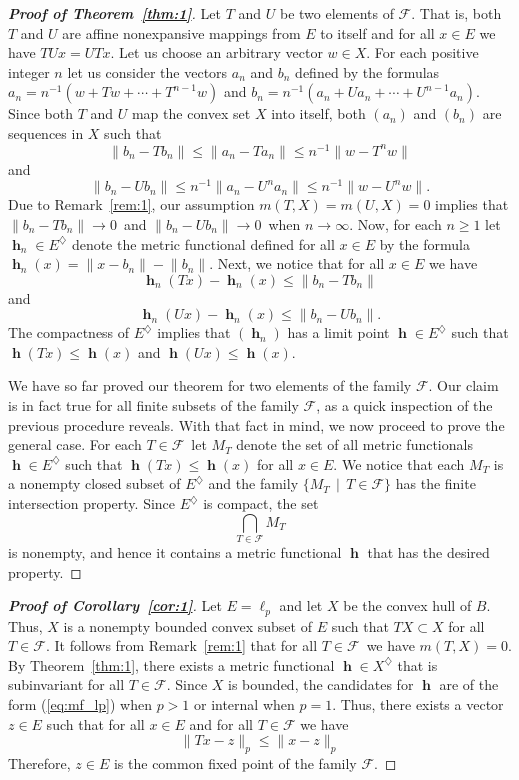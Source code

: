 \documentclass[a4paper,12pt]{article}
\theoremstyle{definition}
\numberwithin{equation}{section}
\newcommand{\norm}[1]{\lVert#1\rVert} %
\newcommand{\F}{\mathcal{F}} %
\numberwithin{equation}{section}
\DeclareMathOperator{\h}{\mathbf{h}} %
\begin{document}
\begin{proof}
[\bf{Proof of Theorem~{\upshape\ref{thm:1}}}]
Let $T$ and $U$ be two elements of $\F$. That 
is, both $T$ and $U$ are affine nonexpansive
mappings from $E$ to itself and for all 
$x \in E$ we have $TUx=UTx$. Let us choose an
arbitrary vector $w\in X$. For each positive
integer $n$ let us consider the vectors $a_n$ 
and $b_n$ defined by the formulas 
$a_n = n^{-1}(w + Tw + \cdots + T^{n-1}w)$
and
$b_n = n^{-1}(a_n + Ua_n + \cdots + U^{n-1}a_n)$.
Since both $T$ and $U$ map the convex set $X$
into itself, both $(a_n)$ and $(b_n)$ are 
sequences in $X$ such that
$$
\norm{b_n - T b_n} 
    \leq \norm{a_n - T a_n} 
    \leq n^{-1}\norm{w - T^n w} 
$$
and 
$$
\norm{b_n - U b_n} 
    \leq n^{-1}\norm{a_n - U^n a_n} 
    \leq n^{-1}\norm{w - U^n w}.
$$
Due to Remark~\ref{rem:1}, our assumption 
$m(T,X)=m(U,X)=0$ implies that  
$\norm{b_n - T b_n} \to 0\,$ and 
$\norm{b_n - U b_n} \to 0\,$ 
when $n\to\infty$. Now, for each $n\geq 1$ 
let $\h_n \in E^\diamondsuit$ denote the 
metric functional defined for all $x\in E$
by the formula 
$\h_n(x) = \norm{x-b_{n}}-\norm{b_{n}}$.
Next, we notice that for all $x\in E$ we have
$$
\h_n(Tx) - \h_n(x) \leq \norm{b_n - T b_n}
$$
and 
$$
\h_n(Ux) - \h_n(x) \leq \norm{b_n - U b_n}.
$$
The compactness of $E^\diamondsuit$ implies 
that $(\h_n)$ has a limit point 
$\h\in E^\diamondsuit$ such that 
$\h(Tx)\leq \h(x)$ and $\h(Ux)\leq\h(x)$.

We have so far proved our theorem for two 
elements of the family $\F$. Our claim is in 
fact true for all finite subsets of the 
family $\F$, as a quick inspection of the 
previous procedure reveals. With that fact in 
mind, we now proceed to prove the general 
case. For each $T \in \F\,$ let $M_T$ denote 
the set of all metric functionals 
$\h \in E^\diamondsuit$ such that 
$\h(Tx)\leq \h(x)$ for all $x \in E$. We
notice that each $M_T$ is a nonempty closed 
subset of $E^\diamondsuit$ and the family 
$\{M_T\,\mid\,T \in \F\}$ has the finite 
intersection property. Since $E^\diamondsuit$
is compact, the set
$$
\bigcap_{T \in \F} M_T 
$$
is nonempty, and hence it contains a metric 
functional $\h$ that has the desired 
property.
\end{proof}

\begin{proof}
[\bf{Proof of Corollary~{\upshape\ref{cor:1}}}]
Let $E=\ell_p$ and let $X$ be the convex hull 
of $B$. Thus, $X$ is a nonempty bounded 
convex subset of $E$ such that $TX \subset X$ 
for all $T \in \F$. It follows from 
Remark~\ref{rem:1} that for all $T\in\F\,$ we 
have $m(T,X) = 0$. By Theorem~\ref{thm:1},  
there exists a metric functional 
$\h\in X^\diamondsuit$ that
is subinvariant for all $T\in \F$. Since $X$ 
is bounded, the candidates for $\h$ are of 
the form (\ref{eq:mf_lp}) when $p>1$ or 
internal when $p=1$. Thus, there exists a 
vector $z\in E$ such that for all $x\in E$ and 
for all $T\in \F$ we have
$$
\norm{Tx-z}_p \leq \norm{x-z}_p
$$
Therefore, $z\in E$ is the common fixed 
point of the family $\F$. 
\end{proof}
\end{document}
